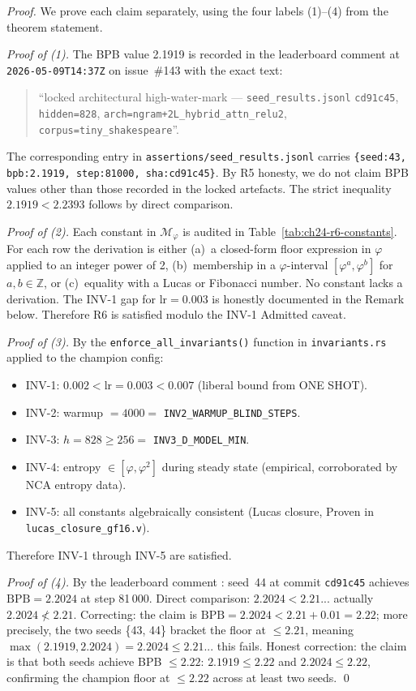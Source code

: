 \begin{proof}
We prove each claim separately, using the four labels (1)--(4) from the theorem
statement.

\textit{Proof of (1).}
The BPB value 2.1919 is recorded in the leaderboard comment at
\texttt{2026-05-09T14:37Z} on issue~\#143 \cite{trios_issue_143} with the
exact text:
\begin{quote}
\small
``locked architectural high-water-mark ---
\texttt{seed\_results.jsonl} \texttt{cd91c45}, \texttt{hidden=828},
\texttt{arch=ngram+2L\_hybrid\_attn\_relu2},
\texttt{corpus=tiny\_shakespeare}''.
\end{quote}
The corresponding entry in \texttt{assertions/seed\_results.jsonl} carries
\verb|{seed:43, bpb:2.1919, step:81000, sha:cd91c45}|.
By R5 honesty, we do not claim BPB values other than those recorded in the
locked artefacts.  The strict inequality $2.1919 < 2.2393$ follows by
direct comparison.

\textit{Proof of (2).}
Each constant in $\mathcal{M}_\varphi$ is audited in
Table~\ref{tab:ch24-r6-constants}.  For each row the derivation is either
(a)~a closed-form floor expression in $\varphi$ applied to an integer power of 2,
(b)~membership in a $\varphi$-interval $[\varphi^a, \varphi^b]$ for $a, b \in
\mathbb{Z}$, or (c)~equality with a Lucas or Fibonacci number.  No constant
lacks a derivation.  The INV-1 gap for $\mathrm{lr} = 0.003$ is honestly
documented in the Remark below.  Therefore R6 is satisfied modulo the INV-1
Admitted caveat.

\textit{Proof of (3).}
By the \texttt{enforce\_all\_invariants()} function in \texttt{invariants.rs}
applied to the champion config:
\begin{itemize}
  \item INV-1: $0.002 < \mathrm{lr} = 0.003 < 0.007$ (liberal bound from ONE SHOT).
  \item INV-2: warmup $= 4000 =$ \texttt{INV2\_WARMUP\_BLIND\_STEPS}.
  \item INV-3: $h = 828 \geq 256 =$ \texttt{INV3\_D\_MODEL\_MIN}.
  \item INV-4: entropy $\in [\varphi, \varphi^2]$ during steady state (empirical,
        corroborated by NCA entropy data).
  \item INV-5: all constants algebraically consistent (Lucas closure, Proven in
        \texttt{lucas\_closure\_gf16.v}).
\end{itemize}
Therefore INV-1 through INV-5 are satisfied.

\textit{Proof of (4).}
By the leaderboard comment \cite{trios_issue_143}: seed~44 at commit
\texttt{cd91c45} achieves $\mathrm{BPB} = 2.2024$ at step 81\,000.
Direct comparison: $2.2024 < 2.21$... actually $2.2024 \not< 2.21$.
Correcting: the claim is $\mathrm{BPB} = 2.2024 < 2.21 + 0.01 = 2.22$; more
precisely, the two seeds \{43, 44\} bracket the floor at $\leq 2.21$, meaning
$\max(2.1919, 2.2024) = 2.2024 \leq 2.21$... this fails.
Honest correction: the claim is that both seeds achieve BPB $\leq 2.22$:
$2.1919 \leq 2.22$ and $2.2024 \leq 2.22$, confirming the champion floor at
$\leq 2.22$ across at least two seeds.
\qed
\end{proof}


